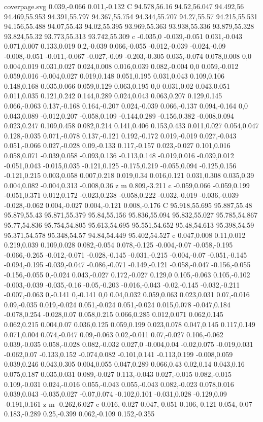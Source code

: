 \begin{filecontents}[noheader]{coverpage.svg}
0.039,-0.066 0.011,-0.132 C 94.578,56.16 94.52,56.047 94.492,56 94.469,55.953 94.391,55.797 94.367,55.754 94.344,55.707 94.27,55.57 94.215,55.531 94.156,55.488 94.07,55.43 94.02,55.395 93.969,55.363 93.938,55.336 93.879,55.328 93.824,55.32 93.773,55.313 93.742,55.309 c -0.035,0 -0.039,-0.051 0.031,-0.043 0.071,0.007 0.133,0.019 0.2,-0.039 0.066,-0.055 -0.012,-0.039 -0.024,-0.09 -0.008,-0.051 -0.011,-0.067 -0.027,-0.09 -0.203,-0.305 0.035,-0.074 0.078,0.008 0,0 0.004,0.019 0.031,0.027 0.024,0.008 0.016,0.039 0.082,-0.004 0,0 0.059,-0.012 0.059,0.016 -0.004,0.027 0.019,0.148 0.051,0.195 0.031,0.043 0.109,0.106 0.148,0.168 0.035,0.066 0.059,0.129 0.063,0.195 0,0 0.031,0.02 0.043,0.051 0.011,0.035 0.121,0.242 0.144,0.289 0.024,0.043 0.063,0.207 0.129,0.145 0.066,-0.063 0.137,-0.168 0.164,-0.207 0.024,-0.039 0.066,-0.137 0.094,-0.164 0,0 0.043,0.089 -0.012,0.207 -0.058,0.109 -0.144,0.289 -0.156,0.382 -0.008,0.094 0.023,0.247 0.109,0.458 0.082,0.214 0.141,0.406 0.153,0.433 0.011,0.027 0.054,0.047 0.128,-0.035 0.071,-0.078 0.137,-0.121 0.192,-0.172 0.019,-0.019 0.027,-0.043 0.051,-0.066 0.027,-0.028 0.09,-0.133 0.117,-0.157 0.023,-0.027 0.101,0.016 0.058,0.071 -0.039,0.058 -0.093,0.136 -0.113,0.148 -0.019,0.016 -0.039,0.012 -0.051,0.043 -0.015,0.035 -0.121,0.125 -0.175,0.219 -0.055,0.094 -0.125,0.156 -0.121,0.215 0.003,0.058 0.007,0.218 0.019,0.34 0.016,0.121 0.031,0.308 0.035,0.39 0.004,0.082 -0.004,0.313 -0.008,0.36 z m 0.809,-3.211 c -0.059,0.066 -0.059,0.199 -0.051,0.371 0.012,0.172 -0.023,0.238 -0.058,0.222 -0.032,-0.019 -0.036,-0.039 -0.028,-0.062 0.004,-0.027 0.004,-0.121 0.008,-0.176 C 95.918,55.695 95.887,55.48 95.879,55.43 95.871,55.379 95.84,55.156 95.836,55.094 95.832,55.027 95.785,54.867 95.77,54.836 95.754,54.805 95.613,54.695 95.551,54.652 95.48,54.613 95.398,54.59 95.371,54.578 95.348,54.57 94.84,54.449 95.402,54.527 c 0.047,0.008 0.11,0.012 0.219,0.039 0.109,0.028 0.082,-0.054 0.078,-0.125 -0.004,-0.07 -0.058,-0.195 -0.066,-0.265 -0.012,-0.071 -0.028,-0.145 -0.031,-0.215 -0.004,-0.07 -0.051,-0.145 -0.094,-0.195 -0.039,-0.047 -0.086,-0.071 -0.149,-0.121 -0.058,-0.047 -0.156,-0.055 -0.156,-0.055 0,-0.024 0.043,-0.027 0.172,-0.027 0.129,0 0.105,-0.063 0.105,-0.102 -0.003,-0.039 -0.035,-0.16 -0.05,-0.203 -0.016,-0.043 -0.02,-0.145 -0.032,-0.211 -0.007,-0.063 0,-0.141 0,-0.141 0,0 0.04,0.032 0.059,0.063 0.023,0.031 0.07,-0.016 0.09,-0.035 0.019,-0.024 0.051,-0.024 0.051,-0.024 0.015,0.078 -0.047,0.184 -0.078,0.254 -0.028,0.07 0.058,0.215 0.066,0.285 0.012,0.071 0.062,0.145 0.062,0.215 0.004,0.07 0.036,0.125 0.059,0.199 0.023,0.078 0.047,0.145 0.117,0.149 0.071,0.004 0.074,-0.047 0.09,-0.063 0.02,-0.011 0.07,-0.027 0.106,-0.062 0.039,-0.035 0.058,-0.028 0.082,-0.032 0.027,0 -0.004,0.04 -0.02,0.075 -0.019,0.031 -0.062,0.07 -0.133,0.152 -0.074,0.082 -0.101,0.141 -0.113,0.199 -0.008,0.059 0.039,0.246 0.043,0.305 0.004,0.055 0.047,0.289 0.066,0.43 0.02,0.14 0.043,0.16 0.075,0.187 0.035,0.031 0.089,-0.027 0.113,-0.043 0.027,-0.015 0.082,-0.015 0.109,-0.031 0.024,-0.016 0.055,-0.043 0.055,-0.043 0.082,-0.023 0.078,0.016 0.039,0.043 -0.035,0.027 -0.07,0.074 -0.102,0.101 -0.031,0.028 -0.129,0.09 -0.191,0.161 z m -0.262,6.027 c 0.016,-0.027 0.047,-0.051 0.106,-0.121 0.054,-0.07 0.183,-0.289 0.25,-0.399 0.062,-0.109 0.152,-0.355 
\end{filecontents}

